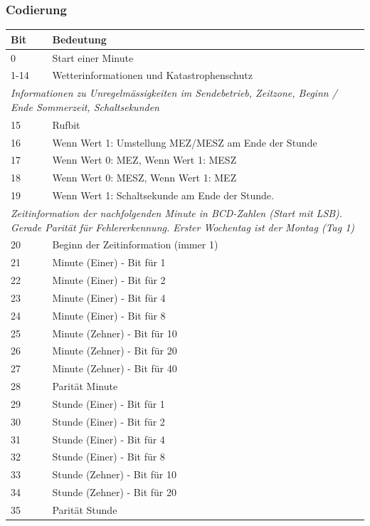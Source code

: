 \subsubsection{Codierung}
\begin{tabular}{p{0.5cm} p{13.5cm}}
\textbf{Bit} & \textbf{Bedeutung} \\ \hline
0 & Start einer Minute \\
1-14 & Wetterinformationen und Katastrophenschutz \\ \hline
\multicolumn{2}{p{14cm}}{\textit{Informationen zu Unregelmässigkeiten im Sendebetrieb, Zeitzone, Beginn / Ende Sommerzeit, Schaltsekunden}}  \\ \hline
15 & Rufbit \\
16 & Wenn Wert 1: Umstellung MEZ/MESZ am Ende der Stunde \\
17 & Wenn Wert 0: MEZ, Wenn Wert 1: MESZ \\
18 & Wenn Wert 0: MESZ, Wenn Wert 1: MEZ \\
19 & Wenn Wert 1: Schaltsekunde am Ende der Stunde. \\ \hline
\multicolumn{2}{p{14cm}}{\textit{Zeitinformation der nachfolgenden Minute in BCD-Zahlen (Start mit LSB). Gerade Parität für Fehlererkennung. Erster Wochentag ist der Montag (Tag 1)}}  \\ \hline
20 & Beginn der Zeitinformation (immer 1) \\
21 & Minute (Einer) - Bit für 1 \\
22 & Minute (Einer) - Bit für 2 \\
23 & Minute (Einer) - Bit für 4 \\
24 & Minute (Einer) - Bit für 8 \\
25 & Minute (Zehner) - Bit für 10 \\
26 & Minute (Zehner) - Bit für 20 \\
27 & Minute (Zehner) - Bit für 40 \\
28 & Parität Minute \\ \hline
29 & Stunde (Einer) - Bit für 1 \\
30 & Stunde (Einer) - Bit für 2 \\
31 & Stunde (Einer) - Bit für 4 \\
32 & Stunde (Einer) - Bit für 8 \\
33 & Stunde (Zehner) - Bit für 10 \\
34 & Stunde (Zehner) - Bit für 20 \\
35 & Parität Stunde \\ \hline
\end{tabular}

